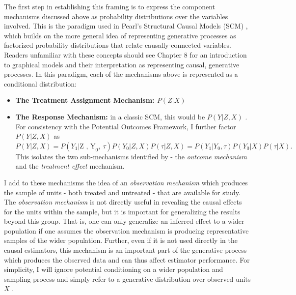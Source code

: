 \documentclass[../main.tex]{subfiles}
\begin{document}
\vspace{\baselineskip}
The first step in establishing this framing is to express the component mechanisms discussed above as probability distributions over the variables involved. This is the paradigm used in Pearl’s Structural Causal Models (SCM) \parencite{Pearl2009CausalOverview}, which builds on the more general idea of representing generative processes as factorized probability distributions that relate causally-connected variables. Readers unfamiliar with these concepts should see \textcite{Bishop2006PatternLearning} Chapter 8 for an introduction to graphical models and their interpretation as representing causal, generative processes. In this paradigm, each of the mechanisms above is represented as a conditional distribution:\par


\vspace{\baselineskip}
\begin{itemize}
    \item \textbf{The Treatment Assignment Mechanism:  \( P \left( Z  \vert  X \right)  \) }\par


\vspace{\baselineskip}
    \item \textbf{The Response Mechanism:} in a classic SCM, this would be \( P \left( Y  \vert  Z, X \right)  \) . For consistency with the Potential Outcomes Framework, I further factor  \( P \left( Y  \vert  Z, X \right)  \)  as  \( P \left( Y  \vert  Z, X \right)  = P \left( Y_{1}  \vert  \text{Z , Y}_{0},~ \tau \right) P \left( Y_{0} \vert Z, X \right) P \left(  \tau \vert Z, X \right)  = P \left( Y_{1}  \vert  Y_{0}, \tau \right) P \left( Y_{0} \vert X \right) P \left(  \tau \vert X \right) .  \) This isolates the two sub-mechanisms identified by \textcite{Kunzel2019MetalearnersLearning} - the \textit{outcome mechanism }and the \textit{treatment effect }mechanism.\par
\end{itemize}\par

\vspace{\baselineskip}
I add to these mechanisms the idea of an \textit{observation mechanism} which produces the sample of units - both treated and untreated - that are available for study. The \textit{observation mechanism} is not directly useful in revealing the causal effects for the units within the sample, but it is important for generalizing the results beyond this group. That is, one can only generalize an inferred effect to a wider population if one assumes the observation mechanism is producing representative samples of the wider population. Further, even if it is not used directly in the causal estimators, this mechanism is an important part of the generative process which produces the observed data and can thus affect estimator performance. For simplicity, I will ignore potential conditioning on a wider population and sampling process and simply refer to a generative distribution over observed units  \( X \) .\par
\end{document}
